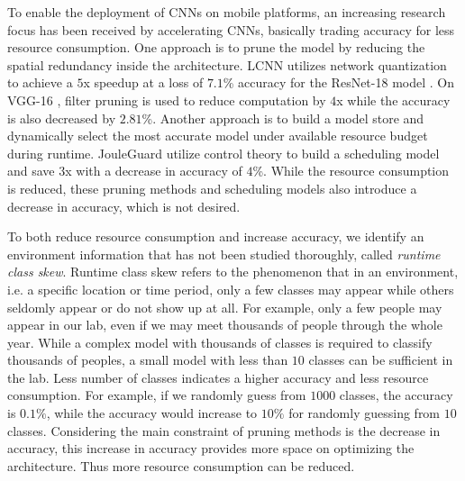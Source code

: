\documentclass[pageno]{jpaper}
\begin{document}
To enable the deployment of CNNs on mobile platforms, an increasing research focus has been received by accelerating CNNs, basically trading accuracy for less resource consumption. One approach is to prune the model by reducing the spatial redundancy inside the architecture. LCNN \cite{bagherinezhad2017lcnn} utilizes network quantization to achieve a $5$x speedup at a loss of $7.1$\% accuracy for the ResNet-18 model \cite{he2016deep}. On VGG-16 \cite{simonyan2014very}, filter pruning \cite{lin2018accelerating} is used to reduce computation by $4$x while the accuracy is also decreased by $2.81$\%. Another approach is to build a model store and dynamically select the most accurate model under available resource budget during runtime. JouleGuard \cite{hoffmann2015jouleguard} utilize control theory to build a scheduling model and save $3$x with a decrease in accuracy of $4$\%. While the resource consumption is reduced, these pruning methods and scheduling models also introduce a decrease in accuracy, which is not desired.


To both reduce resource consumption and increase accuracy, we identify an environment information that has not been studied thoroughly, called \textit{runtime class skew}. Runtime class skew refers to the phenomenon that in an environment, i.e. a specific location or time period, only a few classes may appear while others seldomly appear or do not show up at all. For example, only a few people may appear in our lab, even if we may meet thousands of people through the whole year. While a complex model with thousands of classes is required to classify thousands of peoples, a small model with less than $10$ classes can be sufficient in the lab. Less number of classes indicates a higher accuracy and less resource consumption. For example, if we randomly guess from $1000$ classes, the accuracy is $0.1\%$, while the accuracy would increase to $10\%$ for randomly guessing from $10$ classes. Considering the main constraint of pruning methods is the decrease in accuracy, this increase in accuracy provides more space on optimizing the architecture. Thus more resource consumption can be reduced.
\end{document}

